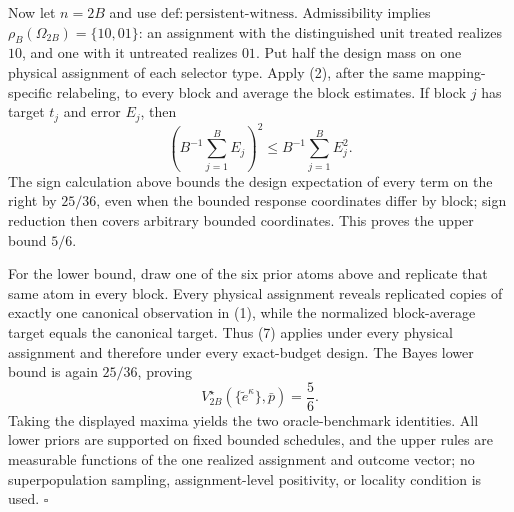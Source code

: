 Now let \(n=2B\) and use \(\mathrm{def{:}persistent\text{-}witness}\). Admissibility implies \(\rho_B(\Omega_{2B})=\{10,01\}\): an assignment with the distinguished unit treated realizes \(10\), and one with it untreated realizes \(01\). Put half the design mass on one physical assignment of each selector type. Apply (2), after the same mapping-specific relabeling, to every block and average the block estimates. If block \(j\) has target \(t_j\) and error \(E_j\), then
\[
 \left(B^{-1}\sum_{j=1}^B E_j\right)^2
 \le B^{-1}\sum_{j=1}^B E_j^2. \tag{9}
\]
The sign calculation above bounds the design expectation of every term on the right by \(25/36\), even when the bounded response coordinates differ by block; sign reduction then covers arbitrary bounded coordinates. This proves the upper bound \(5/6\).

For the lower bound, draw one of the six prior atoms above and replicate that same atom in every block. Every physical assignment reveals replicated copies of exactly one canonical observation in (1), while the normalized block-average target equals the canonical target. Thus (7) applies under every physical assignment and therefore under every exact-budget design. The Bayes lower bound is again \(25/36\), proving
\[
 V_{2B}^\star(\{\widetilde e^\kappa\},\bar p)=\frac56.
\]
Taking the displayed maxima yields the two oracle-benchmark identities. All lower priors are supported on fixed bounded schedules, and the upper rules are measurable functions of the one realized assignment and outcome vector; no superpopulation sampling, assignment-level positivity, or locality condition is used. \(\square\)